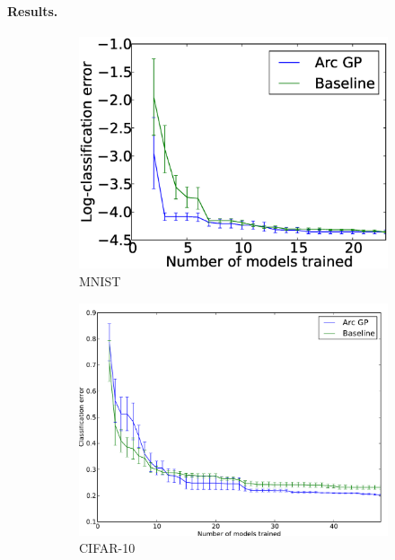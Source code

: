 \documentclass{article}
\begin{document}
\paragraph{Results.}
\begin{figure}[t!]
	\centering
	\begin{subfigure}[]{\columnwidth}
		\includegraphics[width=\columnwidth]{figures/mnist}
		\caption{MNIST}
		\label{fig:mnist}
	\end{subfigure}\quad
	\begin{subfigure}[]{\columnwidth}
		\includegraphics[width=\columnwidth]{figures/cifar10}
		\caption{CIFAR-10}
		\label{fig:cifar10}
	\end{subfigure}\quad
	\begin{subfigure}[]{\columnwidth}

\end{subfigure}
\end{figure}
\end{document}
